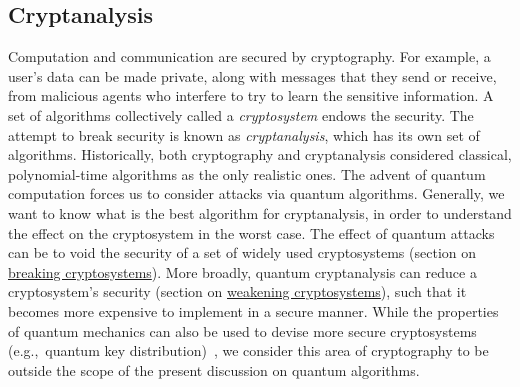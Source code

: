 
\begin{refsection}
    
\section{Cryptanalysis}\label{appl:cryptanalysis}

Computation and communication are secured by cryptography. For example, a user's data can be made private, along with messages that they send or receive, from malicious agents who interfere to try to learn the sensitive information. A set of algorithms collectively called a \emph{cryptosystem} endows the security. The attempt to break security is known as \emph{cryptanalysis}, which has its own set of algorithms. Historically, both cryptography and cryptanalysis considered classical, polynomial-time algorithms as the only realistic ones. The advent of quantum computation forces us to consider attacks via quantum algorithms. Generally, we want to know what is the best algorithm for cryptanalysis, in order to understand the effect on the cryptosystem in the worst case. The effect of quantum attacks can be to void the security of a set of widely used cryptosystems (section on \hyperref[appl:BreakingCrypto]{breaking cryptosystems}). More broadly, quantum cryptanalysis can reduce a cryptosystem's security (section on \hyperref[appl:WeakeningCrypto]{weakening cryptosystems}), such that it becomes more expensive to implement in a secure manner. While the properties of quantum mechanics can also be used to devise more secure cryptosystems (e.g.,~quantum key distribution)~\cite{bennett1984QKD,Pirandola2020QKD,xu2020QKD}, we consider this area of cryptography to be outside the scope of the present discussion on quantum algorithms. 

\localtableofcontents

\printbibliography[heading=secbib,segment=\therefsegment]
\end{refsection}
\newpage

